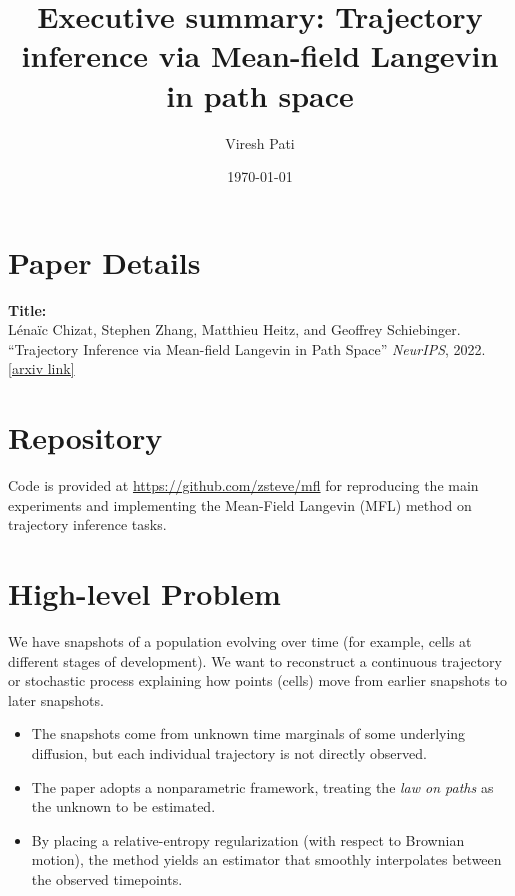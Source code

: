 \documentclass{article}
\title{Executive summary: Trajectory inference via Mean-field Langevin in path space}
\author{Viresh Pati}
\date{\today}
\begin{document}
\maketitle

\section{Paper Details}
\textbf{Title:} 
\\
L\'ena\"ic Chizat, Stephen Zhang, Matthieu Heitz, and Geoffrey Schiebinger.
\\
``Trajectory Inference via Mean-field Langevin in Path Space'' 
\textit{NeurIPS}, 2022.
\\
\href{https://arxiv.org/abs/2205.07146}{[arxiv link]}

\section{Repository}
Code is provided at \url{https://github.com/zsteve/mfl} for reproducing the main experiments 
and implementing the Mean-Field Langevin (MFL) method on trajectory inference tasks.

\section{High-level Problem}
We have snapshots of a population evolving over time (for example, cells at different stages of development). We want to reconstruct a continuous trajectory or stochastic process explaining how points (cells) move from earlier snapshots to later snapshots.

\begin{itemize}
    \item The snapshots come from unknown time marginals of some underlying diffusion, but each individual trajectory is not directly observed.
    \item The paper adopts a nonparametric framework, treating the \emph{law on paths} as the unknown to be estimated.
    \item By placing a relative-entropy regularization (with respect to Brownian motion), the method yields an estimator that smoothly interpolates between the observed timepoints.
\end{itemize}
\end{document}
